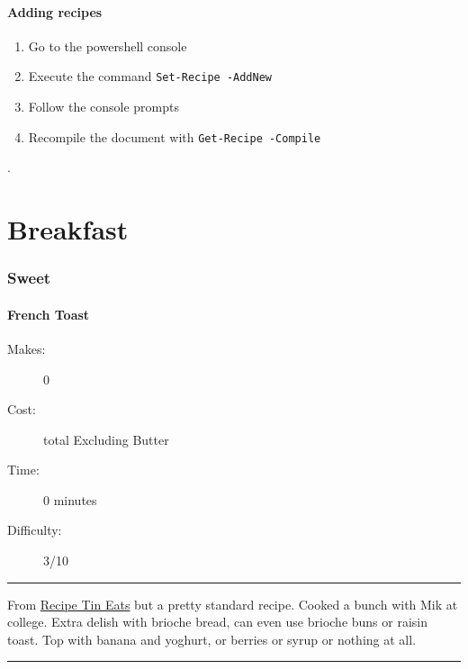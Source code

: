\documentclass[]{article}
\begin{document}
\subsection*{\huge Adding recipes}

\begin{enumerate}
\item Go to the powershell console
\item Execute the command \texttt{\color{accent}Set-Recipe -AddNew}
\item Follow the console prompts
\item Recompile the document with \texttt{\color{accent}Get-Recipe -Compile}
\end{enumerate}

\newpage
\color{white}.\color{black}
\vspace{5cm}
\part{\Huge Breakfast}
\newpage
{}
\section*{\center\Huge\color{accent}Sweet}
\label{cat:Sweet}
\label{rec:French Toast}
\subsection*{\center\huge French Toast}
\begin{description}
\item[Makes:] 0 
\item[Cost:]  total Excluding Butter
\item[Time:] 0 minutes
\item[Difficulty:] 3/10
\end{description}
\vspace{0.2cm}\hrule\vspace{0.5cm}
\begin{adjustwidth}{0.5 cm}{0.5 cm}

From \href{https://www.recipetineats.com/wprm_print/26510}{Recipe Tin Eats} but a pretty standard recipe. Cooked a bunch with Mik at college. Extra delish with brioche bread, can even use brioche buns or raisin toast. Top with banana and yoghurt, or berries or syrup or nothing at all. \hfill{}\color{black}

\end{adjustwidth}
\vspace{0.5cm}\hrule
\end{document}
